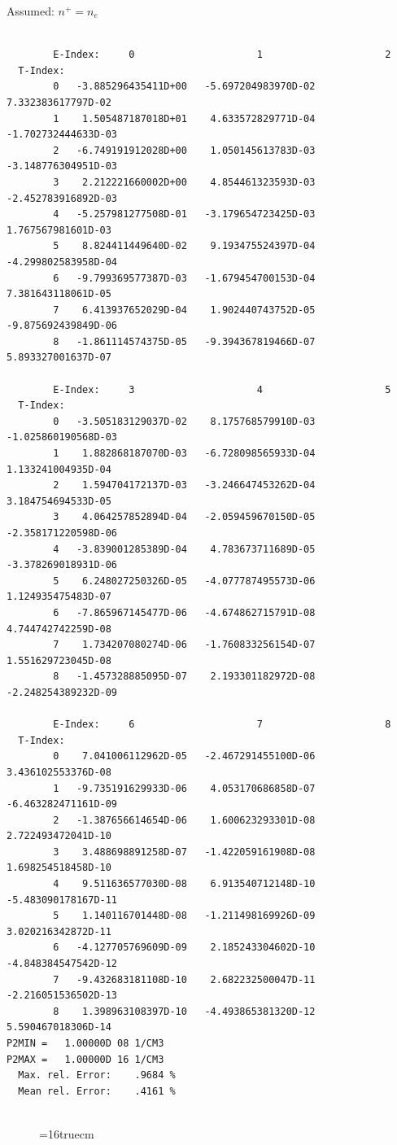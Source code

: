 \documentclass[12pt,dvipdfmx]{article}
\begin{document}
Assumed:  $n^+ = n_e$
\begin{small}\begin{verbatim}

        E-Index:     0                     1                     2
  T-Index:
        0   -3.885296435411D+00   -5.697204983970D-02    7.332383617797D-02
        1    1.505487187018D+01    4.633572829771D-04   -1.702732444633D-03
        2   -6.749191912028D+00    1.050145613783D-03   -3.148776304951D-03
        3    2.212221660002D+00    4.854461323593D-03   -2.452783916892D-03
        4   -5.257981277508D-01   -3.179654723425D-03    1.767567981601D-03
        5    8.824411449640D-02    9.193475524397D-04   -4.299802583958D-04
        6   -9.799369577387D-03   -1.679454700153D-04    7.381643118061D-05
        7    6.413937652029D-04    1.902440743752D-05   -9.875692439849D-06
        8   -1.861114574375D-05   -9.394367819466D-07    5.893327001637D-07

        E-Index:     3                     4                     5
  T-Index:
        0   -3.505183129037D-02    8.175768579910D-03   -1.025860190568D-03
        1    1.882868187070D-03   -6.728098565933D-04    1.133241004935D-04
        2    1.594704172137D-03   -3.246647453262D-04    3.184754694533D-05
        3    4.064257852894D-04   -2.059459670150D-05   -2.358171220598D-06
        4   -3.839001285389D-04    4.783673711689D-05   -3.378269018931D-06
        5    6.248027250326D-05   -4.077787495573D-06    1.124935475483D-07
        6   -7.865967145477D-06   -4.674862715791D-08    4.744742742259D-08
        7    1.734207080274D-06   -1.760833256154D-07    1.551629723045D-08
        8   -1.457328885095D-07    2.193301182972D-08   -2.248254389232D-09

        E-Index:     6                     7                     8
  T-Index:
        0    7.041006112962D-05   -2.467291455100D-06    3.436102553376D-08
        1   -9.735191629933D-06    4.053170686858D-07   -6.463282471161D-09
        2   -1.387656614654D-06    1.600623293301D-08    2.722493472041D-10
        3    3.488698891258D-07   -1.422059161908D-08    1.698254518458D-10
        4    9.511636577030D-08    6.913540712148D-10   -5.483090178167D-11
        5    1.140116701448D-08   -1.211498169926D-09    3.020216342872D-11
        6   -4.127705769609D-09    2.185243304602D-10   -4.848384547542D-12
        7   -9.432683181108D-10    2.682232500047D-11   -2.216051536502D-13
        8    1.398963108397D-10   -4.493865381320D-12    5.590467018306D-14
P2MIN =   1.00000D 08 1/CM3
P2MAX =   1.00000D 16 1/CM3
  Max. rel. Error:    .9684 %
  Mean rel. Error:    .4161 %


\end{verbatim}\end{small}
\begin{figure} \label{2.1.5_equil}
\epsfxsize=16truecm
\end{figure}
\newpage
\end{document}
